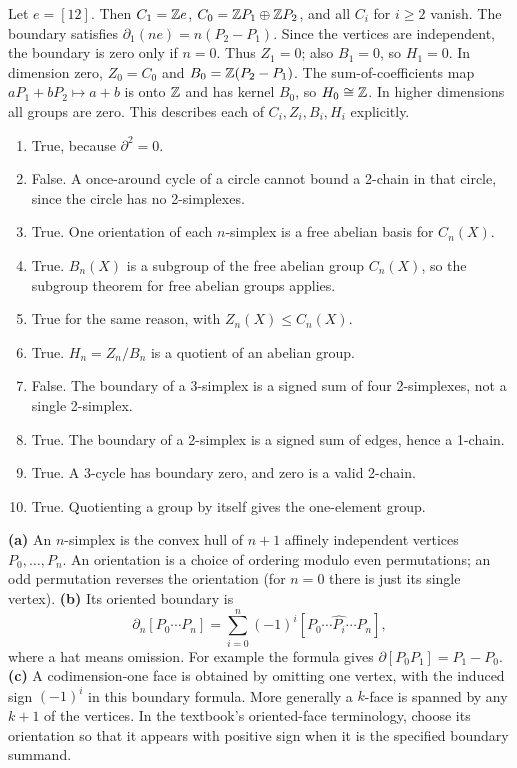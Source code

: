 Let $e=[12]$. Then $C_1=\mathbb{Z} e$, $C_0=\mathbb{Z} P_1\oplus\mathbb{Z} P_2$, and all $C_i$ for $i\ge2$ vanish. The boundary satisfies $\partial_1(ne)=n(P_2-P_1)$.
Since the vertices are independent, the boundary is zero only if $n=0$. Thus $Z_1=0$; also $B_1=0$, so $H_1=0$.
In dimension zero, $Z_0=C_0$ and $B_0=\mathbb{Z}(P_2-P_1)$. The sum-of-coefficients map $aP_1+bP_2\mapsto a+b$ is onto $\mathbb{Z}$ and has kernel $B_0$, so $H_0\cong\mathbb{Z}$.
In higher dimensions all groups are zero. This describes each of $C_i,Z_i,B_i,H_i$ explicitly.

\begin{enumerate}[label=\textbf{(\alph*)}]
\item True, because $\partial^2=0$.
\item False. A once-around cycle of a circle cannot bound a 2-chain in that circle, since the circle has no 2-simplexes.
\item True. One orientation of each $n$-simplex is a free abelian basis for $C_n(X)$.
\item True. $B_n(X)$ is a subgroup of the free abelian group $C_n(X)$, so the subgroup theorem for free abelian groups applies.
\item True for the same reason, with $Z_n(X)\le C_n(X)$.
\item True. $H_n=Z_n/B_n$ is a quotient of an abelian group.
\item False. The boundary of a 3-simplex is a signed sum of four 2-simplexes, not a single 2-simplex.
\item True. The boundary of a 2-simplex is a signed sum of edges, hence a 1-chain.
\item True. A 3-cycle has boundary zero, and zero is a valid 2-chain.
\item True. Quotienting a group by itself gives the one-element group.
\end{enumerate}

\textbf{(a)} An $n$-simplex is the convex hull of $n+1$ affinely independent vertices $P_0,\ldots,P_n$. An orientation is a choice of ordering modulo even permutations; an odd permutation reverses the orientation (for $n=0$ there is just its single vertex).
\textbf{(b)} Its oriented boundary is
\[
\partial_n[P_0\cdots P_n]
=\sum_{i=0}^n(-1)^i[P_0\cdots\widehat{P_i}\cdots P_n],
\]
where a hat means omission. For example the formula gives $\partial[P_0P_1]=P_1-P_0$.
\textbf{(c)} A codimension-one face is obtained by omitting one vertex, with the induced sign $(-1)^i$ in this boundary formula. More generally a $k$-face is spanned by any $k+1$ of the vertices. In the textbook's oriented-face terminology, choose its orientation so that it appears with positive sign when it is the specified boundary summand.

